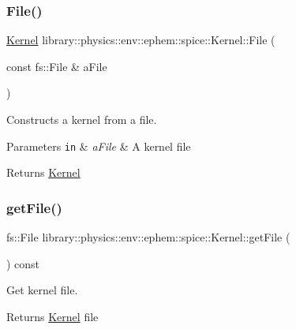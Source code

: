 \subsubsection{\texorpdfstring{File()}{File()}}
{\footnotesize\ttfamily \hyperlink{classlibrary_1_1physics_1_1env_1_1ephem_1_1spice_1_1_kernel}{Kernel} library\+::physics\+::env\+::ephem\+::spice\+::\+Kernel\+::\+File (\begin{DoxyParamCaption}\item[{const fs\+::\+File \&}]{a\+File }\end{DoxyParamCaption})\hspace{0.3cm}{\ttfamily [static]}}



Constructs a kernel from a file. 


\begin{DoxyParams}[1]{Parameters}
\mbox{\tt in}  & {\em a\+File} & A kernel file \\
\hline
\end{DoxyParams}
\begin{DoxyReturn}{Returns}
\hyperlink{classlibrary_1_1physics_1_1env_1_1ephem_1_1spice_1_1_kernel}{Kernel} 
\end{DoxyReturn}
\mbox{\label{classlibrary_1_1physics_1_1env_1_1ephem_1_1spice_1_1_kernel_a5e0166f77d89de5af6279d465a5c22ca}} 
\subsubsection{\texorpdfstring{get\+File()}{getFile()}}
{\footnotesize\ttfamily fs\+::\+File library\+::physics\+::env\+::ephem\+::spice\+::\+Kernel\+::get\+File (\begin{DoxyParamCaption}{ }\end{DoxyParamCaption}) const}



Get kernel file. 

\begin{DoxyReturn}{Returns}
\hyperlink{classlibrary_1_1physics_1_1env_1_1ephem_1_1spice_1_1_kernel}{Kernel} file 
\end{DoxyReturn}
\mbox{\label{classlibrary_1_1physics_1_1env_1_1ephem_1_1spice_1_1_kernel_a18a26cbbb0532f2f7f4e7d03ac7a0afd}} 
